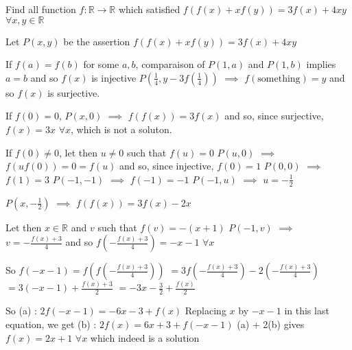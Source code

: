 \begin{solution}
	\begin{tcolorbox}Find all function $f :\mathbb{R} \rightarrow \mathbb{R}$ which satisfied $f(f(x)+xf(y))=3f(x)+4xy$ $\forall x,y \in \mathbb{R}$\end{tcolorbox}
Let $P(x,y)$ be the assertion $f(f(x)+xf(y))=3f(x)+4xy$

If $f(a)=f(b)$ for some $a,b$, comparaison of $P(1,a)$ and $P(1,b)$ implies $a=b$ and so $f(x)$ is injective
$P(\frac 14,y-3f(\frac 14))$ $\implies$ $f(\text{something})=y$ and so $f(x)$ is surjective.

If $f(0)=0$, $P(x,0)$ $\implies$ $f(f(x))=3f(x)$ and so, since surjective, $f(x)=3x$ $\forall x$, which is not a soluton.

If $f(0)\ne 0$, let then $u\ne 0$ such that $f(u)=0$
$P(u,0)$ $\implies$ $f(uf(0))=0=f(u)$ and so, since injective, $f(0)=1$
$P(0,0)$ $\implies$ $f(1)=3$
$P(-1,-1)$ $\implies$ $f(-1)=-1$
$P(-1,u)$ $\implies$ $u=-\frac 12$

$P(x,-\frac 12)$ $\implies$ $f(f(x))=3f(x)-2x$

Let then $x\in\mathbb R$ and $v$ such that $f(v)=-(x+1)$
$P(-1,v)$ $\implies$ $v=-\frac{f(x)+3}4$ and so $f(-\frac{f(x)+3}4)=-x-1$ $\forall x$

So $f(-x-1)=f(f(-\frac{f(x)+3}4))$ $=3f(-\frac{f(x)+3}4)-2(-\frac{f(x)+3}4)$ $=3(-x-1)+\frac{f(x)+3}2$ $=-3x-\frac 32+\frac{f(x)}2$

So  (a) : $2f(-x-1)=-6x-3+f(x)$
Replacing $x$ by $-x-1$ in this last equation, we get (b) : $2f(x)=6x+3+f(-x-1)$
(a) + 2(b) gives $\boxed{f(x)=2x+1}$ $\forall x$ which indeed is a solution
\end{solution}



